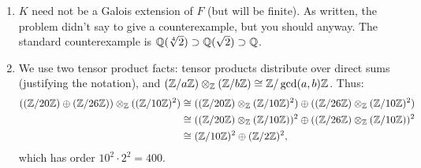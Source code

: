 \begin{solution}
\begin{enumerate}
    The key fact, which is an exercise if you don't already know it, is that an alternating form evaluates to 0 whenever its arguments are linearly dependent. Since $V$ is dimension $n$, any set of $n+1$ vectors will be dependent, and thus any alternating $(n+1)$-linear form will evaluate to 0 on all inputs. Thus, $\dim_K(W) = 0$.
    \item $K$ need not be a Galois extension of $F$ (but will be finite). As written, the problem didn't say to give a counterexample, but you should anyway. The standard counterexample is $\mathbb{Q}(\sqrt[4]{2}) \supset \mathbb{Q}(\sqrt{2}) \supset \mathbb{Q}$.
    \item We use two tensor product facts: tensor products distribute over direct sums (justifying the notation), and $(\mathbb{Z}/a\mathbb{Z}) \otimes_{\mathbb{Z}} (\mathbb{Z}/b\mathbb{Z}) \cong \mathbb{Z}/\gcd(a,b)\mathbb{Z}$. Thus:
    \begin{align*}
        ((\mathbb{Z}/20\mathbb{Z})\oplus (\mathbb{Z}/26\mathbb{Z})) \otimes_{\mathbb{Z}} ((\mathbb{Z}/10\mathbb{Z})^2) &\cong ((\mathbb{Z}/20\mathbb{Z}) \otimes_{\mathbb{Z}} (\mathbb{Z}/10\mathbb{Z})^2) \oplus ((\mathbb{Z}/26\mathbb{Z}) \otimes_{\mathbb{Z}} (\mathbb{Z}/10\mathbb{Z})^2)\\
        &\cong ((\mathbb{Z}/20\mathbb{Z}) \otimes_{\mathbb{Z}} (\mathbb{Z}/10\mathbb{Z}))^2 \oplus ((\mathbb{Z}/26\mathbb{Z}) \otimes_{\mathbb{Z}} (\mathbb{Z}/10\mathbb{Z}))^2\\
        &\cong (\mathbb{Z}/10\mathbb{Z})^2 \oplus (\mathbb{Z}/2\mathbb{Z})^2,
    \end{align*}
    which has order $10^2 \cdot 2^2 = 400$.
\end{enumerate}
\end{solution}

